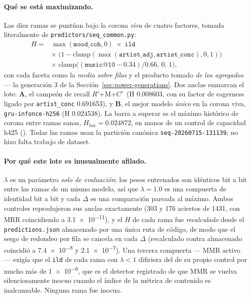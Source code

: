 \documentclass[11pt]{article}
\newcommand{\runid}[1]{\texttt{\small\seqsplit{#1}}}
\newcommand{\dsid}[1]{\texttt{\small #1}}
\newcommand{\Rp}{\ensuremath{R'}}
\newcommand{\Cp}{\ensuremath{C'}}
\begin{document}
\paragraph{Qué se está maximizando.} Las diez ramas se puntúan bajo la corona
\emph{viva} de cuatro factores, tomada literalmente de
\texttt{predictors/seq\_common.py}:
\[
  \begin{aligned}
    H = {}& \max(\texttt{mood\_coh},0)\;\times\;\texttt{ild}\\
          &\times\;\bigl(1-\mathrm{clamp}(\max(\texttt{artist\_adj},
             \texttt{artist\_conc}),0,1)\bigr)\\
          &\times\;\mathrm{clamp}\bigl((\texttt{music@10}-\num{0.34})/\num{0.66},
             \,0,\,1\bigr),
  \end{aligned}
\]
con cada faceta como la \emph{media sobre filas} y el producto tomado \emph{de los
agregados} --- la generación 3 de la Sección~\ref{sec:power-generations}. Dos
anclas enmarcan el lote: \textbf{A}, el campeón de recall \Rp+M+\Cp\ (H
\num{0.008603}, con su factor de eagerness ligado por \texttt{artist\_conc}
\num{0.691653}), y \textbf{B}, el mejor modelo \emph{único} en la corona viva,
\texttt{gru-infonce-h256} (H \num{0.024538}). La barra a superar es el máximo
histórico de corona entre ramas sanas, $H_{\mathrm{bar}} = \num{0.024872}$, en
manos de un control de capacidad h425
(\runid{run-20260725-143502-be11b-seq-nexttrack}). Todas las ramas usan la
partición canónica \dsid{seq-20260715-131139}; no hizo falta trabajo de dataset.

\paragraph{Por qué este lote es inusualmente afilado.} $\lambda$ es un parámetro
\emph{solo de evaluación}: los pesos entrenados son idénticos bit a bit entre las
ramas de un mismo modelo, así que $\lambda=\num{1.0}$ es una compuerta de
identidad bit a bit y cada $\Delta$ es una comparación pareada al máximo. Ambos
controles reprodujeron sus anclas exactamente (\num{303} y \num{176} aciertos de
\num{1431}, con MRR coincidiendo a \num{3.1e-11}), y el $H$ de cada rama fue
\emph{recalculado} desde el \texttt{predictions.json} almacenado por una única ruta
de código, de modo que el sesgo de redondeo por fila se cancela en cada $\Delta$
(recalculado contra almacenado coincidió a \num{7.4e-8} y \num{2.1e-7}). Una
tercera compuerta --- MMR activo --- exigía que el \texttt{ild} de cada rama con
$\lambda<1$ difiriera del de su propio control por mucho más de \num{1e-6}, que es
el detector registrado de que MMR se vuelva silenciosamente inocuo cuando el
índice de la métrica de contenido es inalcanzable. Ninguna rama fue inocua.
\end{document}
